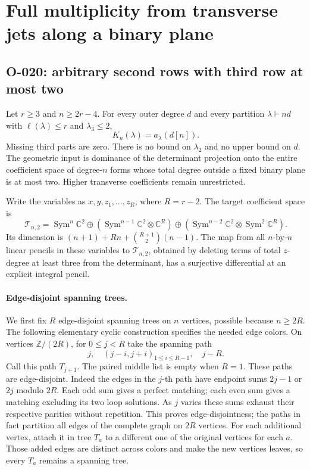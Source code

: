 \section{Full multiplicity from transverse jets along a binary plane}

\subsection{O-020: arbitrary second rows with third row at most two}
Let $r\geq3$ and $n\geq2r-4$. For every outer degree $d$
and every partition $\lambda\vdash nd$ with
$\ell(\lambda)\leq r$ and $\lambda_3\leq2$,
\[
                         K_n(\lambda)=a_\lambda(d[n]).
                                                               \tag{O-020.1}
\]
Missing third parts are zero. There is no bound on
$\lambda_2$ and no upper bound on $d$.
The geometric input is dominance of the determinant projection
onto the entire coefficient space of degree-$n$ forms whose
total degree outside a fixed binary plane is at most two.
Higher transverse coefficients remain unrestricted.

Write the variables as $x,y,z_1,\ldots,z_R$, where $R=r-2$.
The target coefficient space is
\[
 \mathcal T_{n,2}=
 \operatorname{Sym}^n\mathbb C^2
 \oplus\left(\operatorname{Sym}^{n-1}\mathbb C^2
                               \otimes\mathbb C^R\right)
 \oplus\left(\operatorname{Sym}^{n-2}\mathbb C^2
                               \otimes\operatorname{Sym}^2\mathbb C^R\right).
                                                               \tag{O-020.2}
\]
Its dimension is $(n+1)+Rn+\binom{R+1}{2}(n-1)$.
The map from all $n$-by-$n$ linear pencils in these variables
to $\mathcal T_{n,2}$, obtained by deleting terms of
total $z$-degree at least three from the determinant,
has a surjective differential at an explicit integral pencil.

\paragraph{Edge-disjoint spanning trees.}
We first fix $R$ edge-disjoint spanning trees on $n$ vertices,
possible because $n\geq2R$. The following elementary cyclic
construction specifies the needed edge colors.
On vertices $\mathbb Z/(2R)$, for $0\leq j<R$ take
the spanning path
\[
 j,\quad (j-i,j+i)_{1\leq i\leq R-1},\quad j-R.
\]
Call this path $T_{j+1}$. The paired middle list is empty
when $R=1$. These paths are edge-disjoint. Indeed the edges
in the $j$-th path have endpoint sums $2j-1$ or $2j$
modulo $2R$. Each odd sum gives a perfect matching;
each even sum gives a matching excluding its two loop
solutions. As $j$ varies these sums exhaust their respective
parities without repetition. This proves edge-disjointness;
the paths in fact partition all edges of the complete graph
on $2R$ vertices.
For each additional vertex, attach it in tree $T_a$ to a
different one of the original vertices for each $a$.
Those added edges are distinct across colors and make the
new vertices leaves, so every $T_a$ remains a spanning tree.

